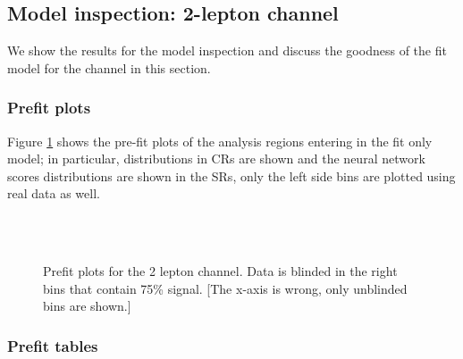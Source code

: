 \clearpage
\subsection{Model inspection: 2-lepton channel}
\label{sec:fit_2lep}

We show the results for the model inspection and discuss the goodness of the fit model for the \tlep channel
in this section.

\subsubsection{Prefit plots}

Figure \ref{fig:fit_2lep_prefit} shows the pre-fit plots of the analysis regions entering in the \tlep fit only model; 
in particular, \mjjtag distributions in \Zjets CRs are shown and the neural network scores distributions 
are shown in the SRs, only the left side bins are plotted using real data as well.

\begin{figure}[ht]
      \centering
\\
\\
	\caption{Prefit plots for the 2 lepton channel. Data is blinded in the right bins that contain 75\% signal. [The x-axis is wrong, only unblinded bins are shown.]}
       \label{fig:fit_2lep_prefit}
\end{figure}

\subsubsection{Prefit tables}

